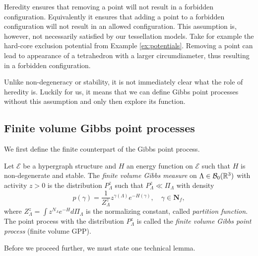 Heredity ensures that removing a point will not result in a forbidden configuration. Equivalently it ensures that adding a point to a forbidden configuration will not result in an allowed configuration. This assumption is, however, not necessarily satisfied by our tessellation models. Take for example the hard-core exclusion potential from Example \ref{ex:potentials}. Removing a point can lead to appearance of a tetrahedron with a larger circumdiameter, thus resulting in a forbidden configuration.\newline

Unlike non-degeneracy or stability, it is not immediately clear what the role of heredity is. Luckily for us, it means that we can define Gibbs point processes without this assumption and only then explore its function.



\subsection{Finite volume Gibbs point processes}
We first define the finite counterpart of the Gibbs point process.

\begin{definition}\label{def:fGPP}
	Let $\mathcal E$ be a hypergraph structure and $H$ an energy function on $\mathcal E$ such that $H$ is non-degenerate and stable. The \textit{finite volume Gibbs measure} on $\Lambda\in \mathcal B_0({\mathbb R^3})$ with activity $z>0$ is the distribution $P^z_\Lambda$ such that $P^z_\Lambda \ll \Pi_\Lambda$ with density
	$$p(\gamma) = \frac 1{Z^{z}_\Lambda} z^{\gamma(\Lambda)} e^{-H(\gamma)},\quad \gamma \in \mathbf N_f,$$
where  $Z^z_\Lambda = \int z^{N_\Lambda} e^{-H} d\Pi_\Lambda$ is the normalizing constant, called \textit{partition function}. \newline
The point process with the distribution $P^z_{\Lambda}$ is called the \textit{finite volume Gibbs point process} (finite volume GPP). 
\end{definition}

Before we proceed further, we must state one technical lemma.


